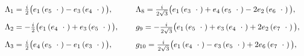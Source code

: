 \documentclass[letterpaper,12pt,titlepage,oneside,final]{book}
\begin{document}
\begin{equation}\begin{array}{lll}\label{g2}

\Lambda_1 = \frac{i}{2}\big(e_1\left(e_5\hspace{2mm} \cdot\hspace{1mm}\right)-e_3\left(e_4 \hspace{2mm}\cdot\hspace{1mm}\right) \big),  &\hspace{1mm}&    \Lambda_8 = \frac{i}{2\sqrt{3}}\big(e_1\left(e_3\hspace{2mm} \cdot\hspace{1mm}\right)+e_4\left(e_5 \hspace{2mm}\cdot\hspace{1mm}\right)   -    2e_2\left(e_6 \hspace{2mm}\cdot\hspace{1mm}\right) \big) , \vspace{3mm} \\



\Lambda_2 = -\frac{i}{2}\big(e_1\left(e_4\hspace{2mm} \cdot\hspace{1mm}\right)+e_3\left(e_5 \hspace{2mm}\cdot\hspace{1mm}\right) \big),  &\hspace{1mm}& g_9 =   -\frac{i}{2\sqrt{3}}\big(e_1\left(e_5\hspace{2mm} \cdot\hspace{1mm}\right)+e_3\left(e_4 \hspace{2mm}\cdot\hspace{1mm}\right)   +    2e_2\left(e_7 \hspace{2mm}\cdot\hspace{1mm}\right) \big),\vspace{3mm} \\





\Lambda_3 = \frac{i}{2}\big(e_4\left(e_5\hspace{2mm} \cdot\hspace{1mm}\right)-e_1\left(e_3 \hspace{2mm}\cdot\hspace{1mm}\right) \big) , &\hspace{1mm}& g_{10} = \frac{i}{2\sqrt{3}}\big(e_1\left(e_4\hspace{2mm} \cdot\hspace{1mm}\right)-e_3\left(e_5 \hspace{2mm}\cdot\hspace{1mm}\right)   +    2e_6\left(e_7 \hspace{2mm}\cdot\hspace{1mm}\right) \big), \vspace{3mm} \\







\end{array}
\end{equation}
\end{document}
